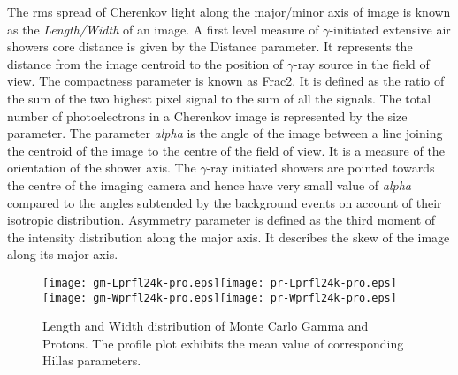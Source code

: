 \documentclass[preprint,12pt]{elsarticle}
\begin{document}
The rms spread of Cherenkov light along the major/minor axis of image is known as the {\it Length/Width} of an image. 
A first level measure of $\gamma$-initiated extensive air showers core distance is given by the Distance parameter. 
It represents the distance from the image centroid to the position of $\gamma$-ray source in the 
field of view. The compactness parameter is known as Frac2. It is defined as the ratio of the sum of the two highest 
pixel signal to the sum of all the signals. The total number of photoelectrons in a Cherenkov image is represented by 
the size parameter. The parameter {\it alpha} is the angle of the image between a line joining the centroid of the 
image to the centre of the field of view. It is a measure of the orientation of the shower axis. The $\gamma$-ray 
initiated showers are pointed towards the centre of the imaging camera and hence have very small value of {\it alpha}
compared to the angles subtended by the background events on account of their isotropic distribution. Asymmetry 
parameter is defined as  the third moment of the intensity distribution along the major axis. It describes the 
skew of the image along its major axis. 
\begin{figure}[!h]
\begin{center}
\texttt{[image: gm-Lprfl24k-pro.eps]}\texttt{[image: pr-Lprfl24k-pro.eps]}
\texttt{[image: gm-Wprfl24k-pro.eps]}\texttt{[image: pr-Wprfl24k-pro.eps]}
\caption{\label{Figure.}Length and Width distribution of Monte Carlo Gamma and Protons. The profile plot exhibits the mean value of corresponding Hillas parameters.}\label{Figure:noele}
\end{center}
\end{figure}
\end{document}
